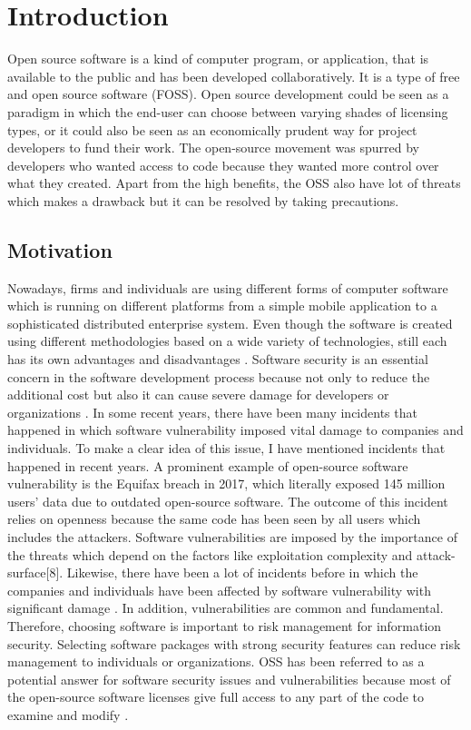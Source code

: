 %
\section{Introduction}\label{sec:introduction}
%
Open source software is a kind of computer program, or application, that is available to the public and has been developed collaboratively. It is a type of free and open source software (FOSS).
Open source development could be seen as a paradigm in which the end-user can choose between varying shades of licensing types, or it could also be seen as an economically prudent way for project developers to fund their work. The open-source movement was spurred by developers who wanted access to code because they wanted more control over what they created. Apart from the high benefits, the OSS also have lot of threats which makes a drawback but it can be resolved by taking precautions. 
\subsection{Motivation}
Nowadays, firms and individuals are using different forms of computer software which is running on different platforms from a simple mobile application to a sophisticated distributed enterprise system. Even though the software is created using different methodologies based on a wide variety of technologies, still each has its own advantages and disadvantages \cite{tur38}\cite{KaDaPeTu2014}. Software security is an essential concern in the software development process because not only to reduce the additional cost but also it can cause severe damage for developers or organizations \cite{fil2}. In some recent years, there have been many incidents that happened in which software vulnerability imposed vital damage to companies and individuals. To make a clear idea of this issue, I have mentioned incidents that happened in recent years. A prominent example of open-source software vulnerability is the Equifax breach in 2017, which literally exposed 145 million users' data due to outdated open-source software. The outcome of this incident relies on openness because the same code has been seen by all users which includes the attackers\cite{WinNT}. Software vulnerabilities are imposed by the importance of the threats which depend on the factors like exploitation complexity and attack-surface[8]. Likewise, there have been a lot of incidents before in which the companies and individuals have been affected by software vulnerability with significant damage \cite{tur38}. In addition, vulnerabilities are common and fundamental. Therefore, choosing software is important to risk management for information security. Selecting software packages with strong security features can reduce risk management to individuals or organizations. \acs{OSS} has been referred to as a potential answer for software security issues and vulnerabilities because most of the open-source software licenses give full access to any part of the code to examine and modify \cite{KeJaSa2005}.

